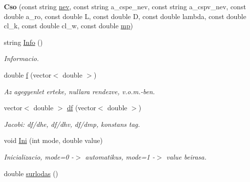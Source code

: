 \begin{DoxyCompactItemize}
\item 
\hypertarget{class_cso_ab04f2170382860dcff777b7185c62ba7}{}\label{class_cso_ab04f2170382860dcff777b7185c62ba7} 
{\bfseries Cso} (const string \hyperlink{class_agelem_abe92b7e3912367d5d1caf6b277ca0b7d}{nev}, const string a\+\_\+cspe\+\_\+nev, const string a\+\_\+cspv\+\_\+nev, const double a\+\_\+ro, const double L, const double D, const double lambda, const double cl\+\_\+k, const double cl\+\_\+w, const double \hyperlink{class_agelem_a1377d80d8511cc4adacccba31d28282d}{mp})
\item 
\hypertarget{class_cso_af6a08482d5949b0924459b7588efd2a0}{}\label{class_cso_af6a08482d5949b0924459b7588efd2a0} 
string \hyperlink{class_cso_af6a08482d5949b0924459b7588efd2a0}{Info} ()
\begin{DoxyCompactList}\small\item\em Informacio. \end{DoxyCompactList}\item 
\hypertarget{class_cso_a5b0e37d3a2f6095e958a7c5f27d8e060}{}\label{class_cso_a5b0e37d3a2f6095e958a7c5f27d8e060} 
double \hyperlink{class_cso_a5b0e37d3a2f6095e958a7c5f27d8e060}{f} (vector$<$ double $>$)
\begin{DoxyCompactList}\small\item\em Az agegyenlet erteke, nullara rendezve, v.\+o.\+m.-\/ben. \end{DoxyCompactList}\item 
\hypertarget{class_cso_acc0b1bb6f9558475a097219d88d07267}{}\label{class_cso_acc0b1bb6f9558475a097219d88d07267} 
vector$<$ double $>$ \hyperlink{class_cso_acc0b1bb6f9558475a097219d88d07267}{df} (vector$<$ double $>$)
\begin{DoxyCompactList}\small\item\em Jacobi\+: df/dhe, df/dhv, df/dmp, konstans tag. \end{DoxyCompactList}\item 
\hypertarget{class_cso_aad51dd17829b413a41f1afb0c275d55c}{}\label{class_cso_aad51dd17829b413a41f1afb0c275d55c} 
void \hyperlink{class_cso_aad51dd17829b413a41f1afb0c275d55c}{Ini} (int mode, double value)
\begin{DoxyCompactList}\small\item\em Inicializacio, mode=0 -\/$>$ automatikus, mode=1 -\/$>$ value beirasa. \end{DoxyCompactList}\item 
double \hyperlink{class_cso_a01d6ba01b924fe317638fe196a139d1f}{surlodas} ()

\end{DoxyCompactItemize}
